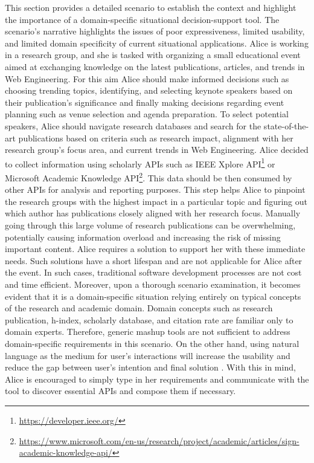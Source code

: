This section provides a detailed scenario to establish the context and highlight the importance of a domain-specific situational decision-support tool. The scenario’s narrative highlights the issues of poor expressiveness, limited usability, and limited domain specificity of current situational applications. Alice is working in a research group, and she is tasked with organizing a small educational event aimed at exchanging knowledge on the latest publications, articles, and trends in Web Engineering. For this aim Alice should make informed decisions such as choosing trending topics, identifying, and selecting keynote speakers based on their publication’s significance and finally making decisions regarding event planning such as venue selection and agenda preparation. 
To select potential speakers, Alice should navigate research databases and search for the state-of-the-art publications based on criteria such as research impact, alignment with her research group’s focus area, and current trends in Web Engineering. Alice decided to collect information using scholarly APIs such as IEEE Xplore API\footnote{\url{https://developer.ieee.org/}} or Microsoft Academic Knowledge API\footnote{\url{https://www.microsoft.com/en-us/research/project/academic/articles/sign-academic-knowledge-api/}}. This data should be then consumed by other APIs for analysis and reporting purposes. This step helps Alice to pinpoint the research groups with the highest impact in a particular topic and figuring out which author has publications closely aligned with her research focus. Manually going through this large volume of research publications can be overwhelming, potentially causing information overload and increasing the risk of missing important content. 
Alice requires a solution to support her with  these immediate needs. Such solutions have a short lifespan and are not applicable for Alice after the event. In such cases, traditional software development processes are not cost and time efficient.
Moreover, upon a thorough scenario examination, it becomes evident that it is a domain-specific situation relying entirely on typical concepts of the research and academic domain. Domain concepts such as research publication, h-index, scholarly database, and citation rate are familiar only to domain experts. Therefore, generic mashup tools are not sufficient to address domain-specific requirements in this scenario. On the other hand, using natural language as the medium for user’s interactions will increase the usability and reduce the gap between user’s intention and final solution \autocite{Zarei2021}. With this in mind, Alice is encouraged to simply type in her requirements and communicate with the tool to discover essential APIs and compose them if necessary.


